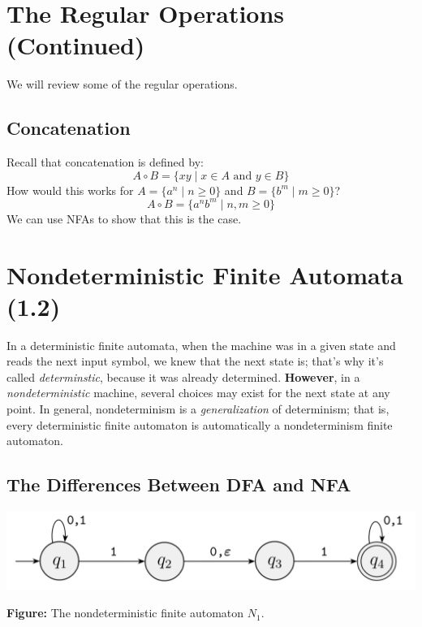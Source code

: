 \documentclass[letterpaper]{article}
\begin{document}
\section{The Regular Operations (Continued)}
We will review some of the regular operations. 

\subsection{Concatenation}
Recall that concatenation is defined by: 
\[A \circ B = \{xy \mid x \in A \text{ and } y \in B\}\]
How would this works for $A = \{a^n \mid n \geq 0\}$ and $B = \{b^m \mid m \geq 0\}$?
\[A \circ B = \{a^n b^m \mid n, m \geq 0\}\]
We can use NFAs to show that this is the case. 

\section{Nondeterministic Finite Automata (1.2)}
In a deterministic finite automata, when the machine was in a given state and reads the next input symbol, we knew that the next state is; that's why it's called \emph{determinstic}, because it was already determined. \textbf{However}, in a \emph{nondeterministic} machine, several choices may exist for the next state at any point. In general, nondeterminism is a \emph{generalization} of determinism; that is, every deterministic finite automaton is automatically a nondeterminism finite automaton.

\subsection{The Differences Between DFA and NFA}
\begin{center}
    \includegraphics[scale=0.4]{../assets/nfa_1.png}
    
    \textbf{Figure:} The nondeterministic finite automaton $N_1$. 
\end{center}
\end{document}
